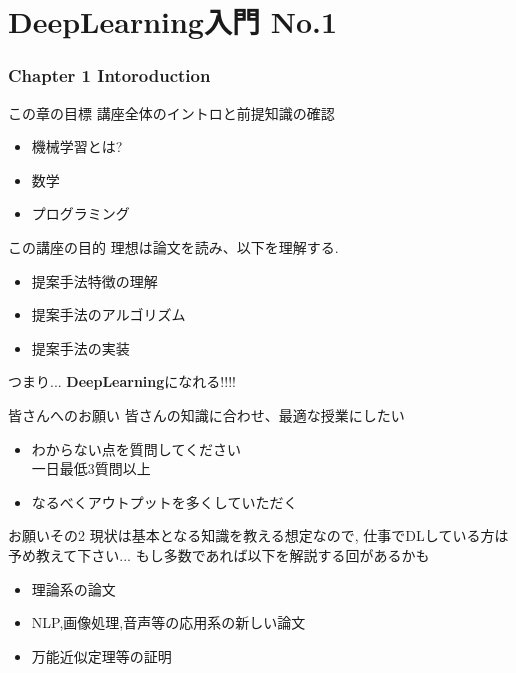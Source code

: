 \part{ DeepLearning入門 No.1}


\section{Chapter 1 Intoroduction}
\begin{frame}{この章の目標}
講座全体のイントロと前提知識の確認
\begin{itemize}
    \item 機械学習とは?
    \item 数学
    \item  プログラミング
\end{itemize}
\end{frame}


\begin{frame}{この講座の目的}
理想は論文を読み、以下を理解する.
\begin{itemize}
    \item 提案手法特徴の理解
    \item 提案手法のアルゴリズム
    \item 提案手法の実装
\end{itemize}
つまり... \textbf{DeepLearning}になれる!!!!
\end{frame}


\begin{frame}{皆さんへのお願い}
皆さんの知識に合わせ、最適な授業にしたい
\begin{itemize}
    \item わからない点を質問してください \\
          一日最低3質問以上
   \item なるべくアウトプットを多くしていただく
\end{itemize}
\end{frame}



\begin{frame}{お願いその2}
現状は基本となる知識を教える想定なので,
仕事でDLしている方は予め教えて下さい...
もし多数であれば以下を解説する回があるかも
\begin{itemize}
    \item 理論系の論文
    \item NLP,画像処理,音声等の応用系の新しい論文
    \item 万能近似定理等の証明
\end{itemize}
\end{frame}

